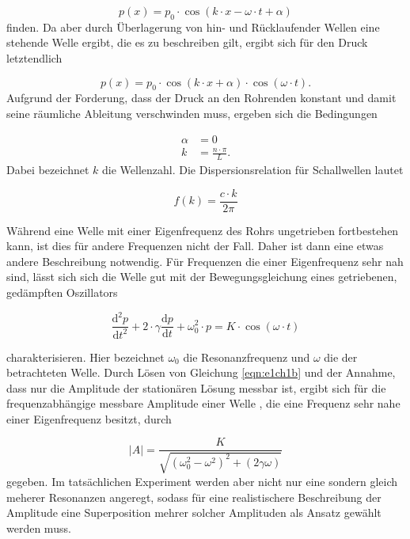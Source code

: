 \begin{equation}
  \label{eqn:e3ch1}
  p(x) = p_{0} \cdot \cos\left( k\cdot x - \omega \cdot t + \alpha \right)
\end{equation}
finden. Da aber durch Überlagerung von hin- und Rücklaufender Wellen eine stehende Welle ergibt, die es
zu beschreiben gilt, ergibt sich für den Druck letztendlich

\begin{equation}
  \label{eqn:e4ch1}
  p(x) = p_{0} \cdot \cos\left( k \cdot x + \alpha \right) \cdot \cos\left( \omega \cdot t \right).
\end{equation}
Aufgrund der Forderung, dass der Druck an den Rohrenden konstant und damit seine
räumliche Ableitung verschwinden muss, ergeben sich die Bedingungen


\begin{align}
  \alpha &= 0 \\
  k &= \frac{n \cdot \pi}{L}.
\end{align}
Dabei bezeichnet $k$ die Wellenzahl.
Die Dispersionsrelation für Schallwellen lautet


\begin{equation}
  \label{eqn:e7ch1}
  f(k) = \frac{c \cdot k}{2\pi}
\end{equation}


Während eine Welle mit einer Eigenfrequenz des Rohrs ungetrieben fortbestehen kann, ist dies für andere
Frequenzen nicht der Fall. Daher ist dann eine etwas andere Beschreibung notwendig. Für Frequenzen
die einer Eigenfrequenz sehr nah sind, lässt sich sich die Welle gut mit der Bewegungsgleichung
eines getriebenen, gedämpften Oszillators


\begin{equation}
  \label{eqn:e1ch1b}
  \frac{\mathrm{d}^2 p}{\mathrm{d}t^2} + 2 \cdot \gamma \frac{\mathrm{d} p}{\mathrm{d}t} + \omega_{0}^2 \cdot p = K \cdot \cos\left( \omega \cdot t \right)
\end{equation}

charakterisieren.
Hier bezeichnet $\omega_{0}$ die Resonanzfrequenz und $\omega$ die der betrachteten Welle.
Durch Lösen von Gleichung \eqref{eqn:e1ch1b} und der Annahme, dass nur die Amplitude der stationären Lösung
messbar ist, ergibt sich für die frequenzabhängige messbare Amplitude einer Welle , die eine Frequenz sehr nahe
einer Eigenfrequenz besitzt, durch


\begin{equation}
  \label{eqn:e2ch1b}
  |A| = \frac{K}{\sqrt{\left( \omega_{0}^2 - \omega^2 \right)^2 + \left( 2 \gamma \omega \right)}}
\end{equation}
gegeben.
Im tatsächlichen Experiment werden aber nicht nur eine sondern gleich meherer Resonanzen angeregt, sodass
für eine realistischere Beschreibung der Amplitude eine Superposition mehrer solcher Amplituden als Ansatz gewählt werden muss.

